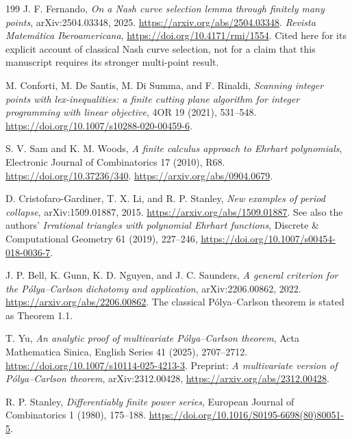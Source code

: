 \documentclass[11pt,a4paper]{article}
\numberwithin{equation}{section}
\theoremstyle{plain}
\newcounter{polybibc}
\newenvironment{polybiblist}[1]{\let\section\subsection\renewcommand{\refname}{#1}%
 \begin{thebibliography}{199}\setcounter{enumiv}{\value{polybibc}}}%
 {\setcounter{polybibc}{\value{enumiv}}\end{thebibliography}}
\begin{document}
\begin{polybiblist}{Part IV (manuscript 03)}
J. F. Fernando, \emph{On a Nash curve selection lemma through finitely
many points}, arXiv:2504.03348, 2025.
\url{https://arxiv.org/abs/2504.03348}.
\emph{Revista Matem\'atica Iberoamericana},
\url{https://doi.org/10.4171/rmi/1554}.
Cited here for its explicit account of classical Nash curve selection,
not for a claim that this manuscript requires its stronger multi-point result.

M. Conforti, M. De Santis, M. Di Summa, and F. Rinaldi,
\emph{Scanning integer points with lex-inequalities: a finite cutting plane
algorithm for integer programming with linear objective},
4OR 19 (2021), 531--548.
\url{https://doi.org/10.1007/s10288-020-00459-6}.

S. V. Sam and K. M. Woods, \emph{A finite calculus approach to Ehrhart
polynomials}, Electronic Journal of Combinatorics 17 (2010), R68.
\url{https://doi.org/10.37236/340}.
\url{https://arxiv.org/abs/0904.0679}.

D. Cristofaro-Gardiner, T. X. Li, and R. P. Stanley,
\emph{New examples of period collapse}, arXiv:1509.01887, 2015.
\url{https://arxiv.org/abs/1509.01887}.
See also the authors' \emph{Irrational triangles with polynomial Ehrhart
functions}, Discrete \& Computational Geometry 61 (2019), 227--246,
\url{https://doi.org/10.1007/s00454-018-0036-7}.

J. P. Bell, K. Gunn, K. D. Nguyen, and J. C. Saunders,
\emph{A general criterion for the P\'olya--Carlson dichotomy and
application}, arXiv:2206.00862, 2022.
\url{https://arxiv.org/abs/2206.00862}.
The classical P\'olya--Carlson theorem is stated as Theorem 1.1.

T. Yu, \emph{An analytic proof of multivariate P\'olya--Carlson theorem},
Acta Mathematica Sinica, English Series 41 (2025), 2707--2712.
\url{https://doi.org/10.1007/s10114-025-4213-3}.
Preprint: \emph{A multivariate version of P\'olya--Carlson theorem},
arXiv:2312.00428, \url{https://arxiv.org/abs/2312.00428}.

R. P. Stanley, \emph{Differentiably finite power series},
European Journal of Combinatorics 1 (1980), 175--188.
\url{https://doi.org/10.1016/S0195-6698(80)80051-5}.

\end{polybiblist}
\end{document}
